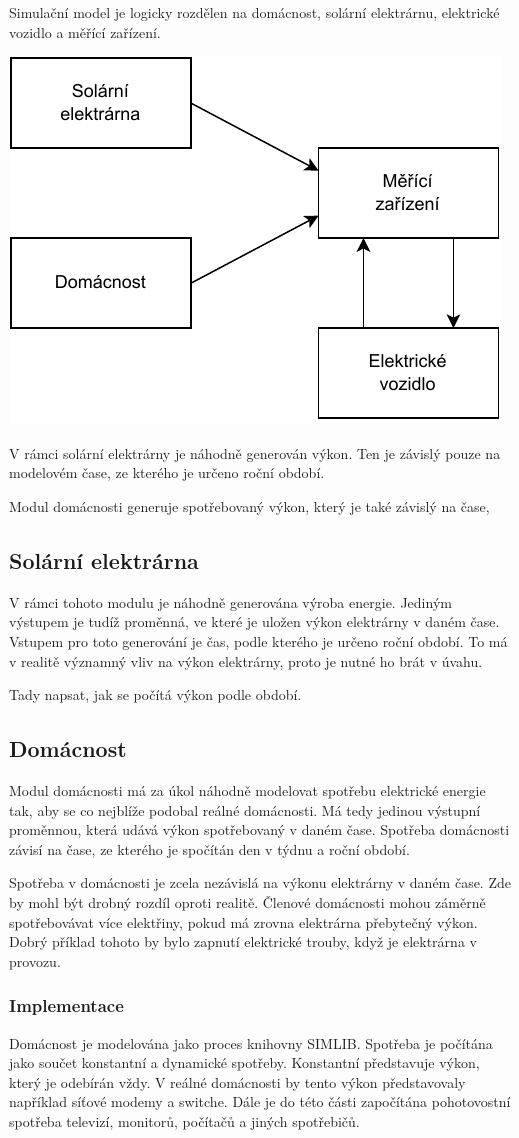\documentclass[12pt,a4paper]{article}
\begin{document}
Simulační model je logicky rozdělen na domácnost, solární elektrárnu, elektrické vozidlo a měřící zařízení.

\bigskip
\includegraphics[width=0.5\linewidth]{img/diagram.pdf}
\bigskip

V rámci solární elektrárny je náhodně generován výkon.
Ten je závislý pouze na modelovém čase, ze kterého je určeno roční období.

Modul domácnosti generuje spotřebovaný výkon, který je také závislý na čase,


\subsection{Solární elektrárna}
V rámci tohoto modulu je náhodně generována výroba energie.
Jediným výstupem je tudíž proměnná, ve které je uložen výkon elektrárny v daném čase.
Vstupem pro toto generování je čas, podle kterého je určeno roční období.
To má v realitě významný vliv na výkon elektrárny, proto je nutné ho brát v úvahu.


Tady napsat, jak se počítá výkon podle období.


\subsection{Domácnost}
Modul domácnosti má za úkol náhodně modelovat spotřebu elektrické energie tak,
aby se co nejblíže podobal reálné domácnosti.
Má tedy jedinou výstupní proměnnou, která udává výkon spotřebovaný v daném čase.
Spotřeba domácnosti závisí na čase, ze kterého je spočítán den v týdnu a roční období.

Spotřeba v domácnosti je zcela nezávislá na výkonu elektrárny v daném čase.
Zde by mohl být drobný rozdíl oproti realitě.
Členové domácnosti mohou záměrně spotřebovávat více elektřiny, pokud má zrovna elektrárna přebytečný výkon.
Dobrý příklad tohoto by bylo zapnutí elektrické trouby, když je elektrárna v provozu.

\subsubsection{Implementace}
Domácnost je modelována jako proces knihovny SIMLIB.
Spotřeba je počítána jako součet konstantní a dynamické spotřeby.
Konstantní představuje výkon, který je odebírán vždy.
V reálné domácnosti by tento výkon představovaly například síťové modemy a switche.
Dále je do této části započítána pohotovostní spotřeba televizí, monitorů, počítačů a jiných spotřebičů.
\end{document}
